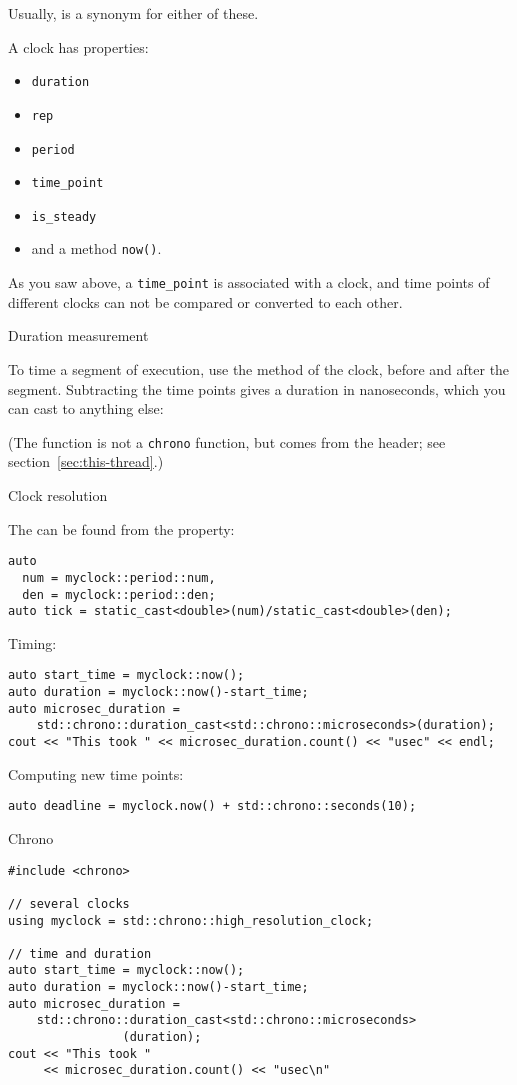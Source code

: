 Usually,  is a synonym
for either of these.

A clock has properties:
\begin{itemize}
\item \lstinline{duration}
\item \lstinline{rep}
\item \lstinline{period}
\item \lstinline+time_point+
\item \lstinline+is_steady+
\item and a method \lstinline+now()+.
\end{itemize}

As you saw above, a \lstinline+time_point+ is associated with a clock,
and time points of different clocks can not be compared or converted to each other.

 {Duration measurement}

To time a segment of execution, use the  method of the clock,
before and after the segment.
Subtracting the time points gives a duration in nanoseconds,
which you can cast to anything else:
%

(The  function is not a \lstinline{chrono} function,
but comes from the  header;
see section~\ref{sec:this-thread}.)

 {Clock resolution}

The  can be found from the  property:
\begin{lstlisting}
auto
  num = myclock::period::num,
  den = myclock::period::den;
auto tick = static_cast<double>(num)/static_cast<double>(den);
\end{lstlisting}

Timing:
\begin{lstlisting}
auto start_time = myclock::now();
auto duration = myclock::now()-start_time;
auto microsec_duration =
    std::chrono::duration_cast<std::chrono::microseconds>(duration);
cout << "This took " << microsec_duration.count() << "usec" << endl;
\end{lstlisting}

Computing new time points:
\begin{lstlisting}
auto deadline = myclock.now() + std::chrono::seconds(10);
\end{lstlisting}

\begin{slide}{Chrono}
\label{sl:chrono}
\begin{lstlisting}
#include <chrono>

// several clocks
using myclock = std::chrono::high_resolution_clock;

// time and duration
auto start_time = myclock::now();
auto duration = myclock::now()-start_time;
auto microsec_duration =
    std::chrono::duration_cast<std::chrono::microseconds>
                (duration);
cout << "This took "
     << microsec_duration.count() << "usec\n"
\end{lstlisting}
\end{slide}

